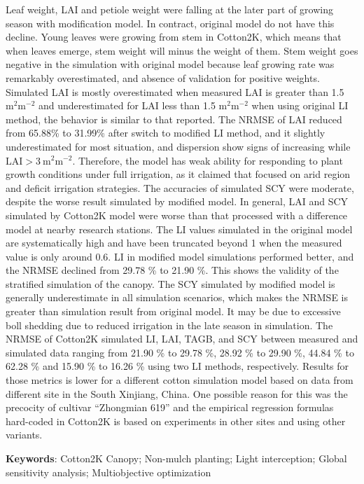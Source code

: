 \begin{spacing}{}
Leaf weight, LAI and petiole weight were falling at the later part of growing season with modification model.
In contract, original model do not have this decline.
Young leaves were growing from stem in Cotton2K, which means that when leaves emerge, stem weight will minus the weight of them.
Stem weight goes negative in the simulation with original model because leaf growing rate was remarkably overestimated,
and absence of validation for positive weights.
Simulated LAI is mostly overestimated when measured LAI is greater than 1.5 $\mathrm{m^2 m^{-2}}$ and underestimated
for LAI less than 1.5 $\mathrm{m^2 m^{-2}}$ when using original LI method, the behavior is similar to that
 reported.
The NRMSE of LAI reduced from 65.88\% to 31.99\% after switch to modified LI method, and it slightly underestimated for
most situation, and dispersion show signs of increasing while $\mathrm{LAI > 3\ m^2 m^{-2}}$.
Therefore, the model has weak ability for responding to plant growth conditions under full irrigation, as it claimed
that focused on arid region and deficit irrigation strategies.
The accuracies of simulated SCY were moderate, despite the worse result simulated by modified model.
In general, LAI and SCY simulated by Cotton2K model were worse than that processed with a difference model at nearby
research stations.
The LI values simulated in the original model are systematically high and have been truncated beyond 1 when the measured value is only around 0.6.
LI in modified model simulations performed better, and the NRMSE declined from 29.78 \% to 21.90 \%.
This shows the validity of the stratified simulation of the canopy.
The SCY simulated by modified model is generally underestimate in all simulation scenarios, which makes the NRMSE is
greater than simulation result from original model.
It may be due to excessive boll shedding due to reduced irrigation in the late season in simulation.
The NRMSE of Cotton2K simulated LI, LAI, TAGB, and SCY between measured and simulated data ranging from
21.90 \% to 29.78 \%, 28.92 \% to 29.90 \%, 44.84 \% to 62.28 \% and 15.90 \% to 16.26 \% using two LI methods, respectively.
Results for those metrics is lower for a different cotton simulation model based on data from different site in the South Xinjiang, China.
One possible reason for this was the precocity of cultivar ``Zhongmian 619'' and the empirical regression formulas hard-coded in Cotton2K
is based on experiments in other sites and using other variants.

\textbf{Keywords}: Cotton2K Canopy; Non-mulch planting; Light interception; Global sensitivity analysis; Multiobjective optimization
\end{spacing}